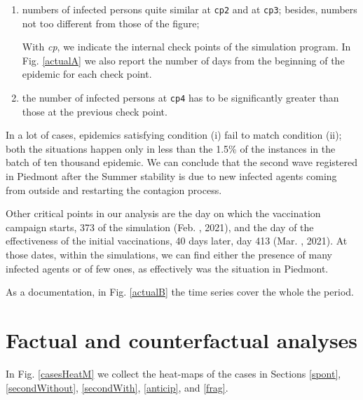 \documentclass[graybox]{svmult}
\begin{document}
\begin{enumerate}[label=\roman*]
\item numbers of infected persons quite similar at \verb|cp2| and at \verb|cp3|; besides, numbers not too different from those of the figure; 

With \emph{cp}, we indicate the internal check points of the simulation program. In Fig. \ref{actualA} we also report the number of days from the beginning of the epidemic for each check point. 

\item the number of infected persons at \verb|cp4| has to be significantly greater than those at the previous check point.

\end{enumerate}

In a lot of cases, epidemics satisfying condition (i) fail to match condition (ii); both the situations happen only in less than the 1.5\% of the instances in the batch of ten thousand epidemic. We can conclude that the second wave registered in Piedmont after the Summer stability is due to new infected agents coming from outside and restarting the contagion process.

Other critical points in our analysis are the day on which the vaccination campaign starts, 373 of the simulation (Feb. , 2021), and the day of the effectiveness of the initial vaccinations, 40 days later, day 413 (Mar. , 2021). At those dates, within the simulations, we can find either the presence of many infected agents or of few ones, as effectively was the situation in Piedmont.

As a documentation, in Fig. \ref{actualB} the time series cover the whole the period.



\section{Factual and counterfactual analyses}
\label{facCounterfac}

In Fig. \ref{casesHeatM} we collect the heat-maps of the cases in Sections \ref{spont}, \ref{secondWithout}, \ref{secondWith}, \ref{anticip}, and \ref{frag}.
\end{document}
